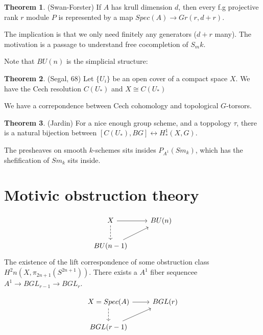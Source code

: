 \documentclass{article}
\theoremstyle{definition}
\newtheorem{theorem}{Theorem}[section]
\theoremstyle{definition}
\theoremstyle{definition}
\theoremstyle{definition}
\theoremstyle{definition}
\theoremstyle{definition}
\theoremstyle{definition}
\begin{document}
\begin{tcolorbox}[colback=red!5!white,colframe=red!30!white]
\begin{theorem}
(Swan-Forster) If $A$ has krull dimension $d$, then every f.g projective rank $r$ module $P$ is represented by a map $Spec(A)\to Gr(r,d+r)$. 
\end{theorem}
\end{tcolorbox}
The implication is that we only need finitely any generators ($d+r$ many). The motivation is a passage 
to understand free cocompletion of $S_mk$. 

Note that $BU(n)$ is the simplicial structure: 


\begin{tcolorbox}[colback=red!5!white,colframe=red!30!white]
\begin{theorem}
(Segal, 68) Let $\{ U_i \}$ be an open cover of a compact space $X$. We have the Cech resolution $C(U_*)$ and $X\cong C(U_*)$
\end{theorem}
\end{tcolorbox}
We have a correpondence between Cech cohomology and topological $G$-torsors. 


\begin{tcolorbox}[colback=red!5!white,colframe=red!30!white]
\begin{theorem}
(Jardin) For a nice enough group scheme, and a toppology $\tau$, there is a natural bijection between $[C(U_*), BG]\longleftrightarrow H_*^1(X,G)$. 
\end{theorem}
\end{tcolorbox}

The presheaves on smooth $k$-schemes sits insides $P_{A^1}(Sm_k)$, which has the shefification of $Sm_k$ sits inside. 

\section*{Motivic obstruction theory}

\[\begin{tikzcd}
X\arrow[d,dashed]\arrow[r]& BU(n)\\
BU(n-1)\arrow[ur]&
\end{tikzcd}\]
The existence of the lift correspondence of some obstruction class $H^2n(X, \pi_{2n+1}(S^{2n+1}))$. There exists a $A^1$ fiber sequencee $A^1\to BGL_{r-1}\to BGL_{r}$.

\[\begin{tikzcd}
    X=Spec(A)\arrow[d,dashed]\arrow[r]& BGL(r)\\
    BGL(r-1)\arrow[ur]&
    \end{tikzcd}\]
\end{document}

